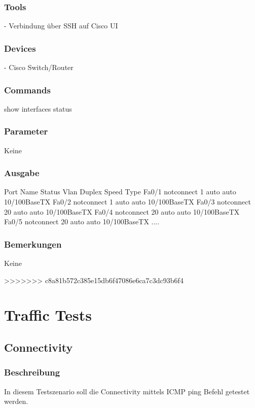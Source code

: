 \documentclass[a4,12pt]{scrartcl}
\begin{document}
\subsubsection{Tools}
- Verbindung über SSH auf Cisco UI
\subsubsection{Devices}
- Cisco Switch/Router
\subsubsection{Commands}
show interfaces status
\subsubsection{Parameter}
Keine
\subsubsection{Ausgabe}
Port      Name               Status       Vlan       Duplex  Speed Type\newline
Fa0/1                        notconnect   1            auto   auto 10/100BaseTX\newline
Fa0/2                        notconnect   1            auto   auto 10/100BaseTX\newline
Fa0/3                        notconnect   20           auto   auto 10/100BaseTX\newline
Fa0/4                        notconnect   20           auto   auto 10/100BaseTX\newline
Fa0/5                        notconnect   20           auto   auto 10/100BaseTX\newline
....\newline
\subsubsection{Bemerkungen}
Keine



>>>>>>> c8a81b572c385e15db6f47086e6ca7c3dc93b6f4

\newpage
\section{Traffic Tests}
\subsection{Connectivity}
\subsubsection{Beschreibung}
In diesem Testszenario soll die Connectivity mittels ICMP ping Befehl getestet werden.
\end{document}
